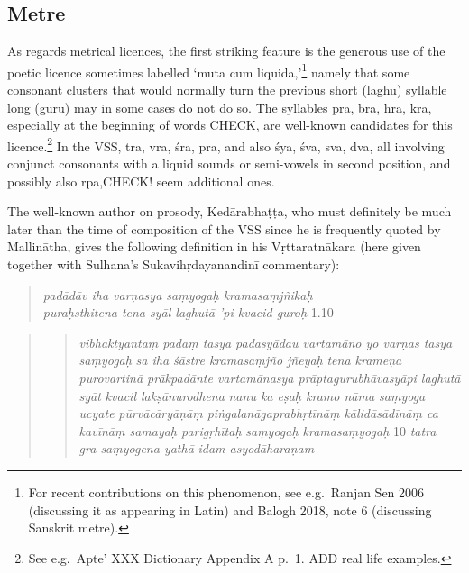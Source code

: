 \documentclass[12pt]{book}
\begin{document}
{%
\subsection{Metre}\label{metre}}

As regards metrical licences, the first striking feature is the generous
use of the poetic licence sometimes labelled `muta cum
liquida,'\footnote{For recent contributions on this phenomenon, see
  e.g.~Ranjan Sen 2006 (discussing it as appearing in Latin) and Balogh
  2018, note 6 (discussing Sanskrit metre).} namely that some consonant
clusters that would normally turn the previous short (laghu) syllable
long (guru) may in some cases do not do so. The syllables pra, bra, hra,
kra, especially at the beginning of words CHECK, are well-known
candidates for this licence.\footnote{See e.g.~Apte' XXX Dictionary
  Appendix A p.~1. ADD real life examples.} In the VSS, tra, vra, śra,
pra, and also śya, śva, sva, dva, all involving conjunct consonants with
a liquid sounds or semi-vowels in second position, and possibly also
rpa,CHECK! seem additional ones.

The well-known author on prosody, Kedārabhaṭṭa, who must definitely be
much later than the time of composition of the VSS since he is
frequently quoted by Mallinātha, gives the following definition in his
Vṛttaratnākara (here given together with Sulhana's Sukavihṛdayanandinī
commentary):

\begin{quote}
\emph{padādāv iha varṇasya saṃyogaḥ kramasaṃjñikaḥ} \textbar{}\\
\emph{puraḥsthitena tena syāl laghutā 'pi kvacid guroḥ}
\textbar{}\textbar{} 1.10 \textbar{}\textbar{}
\end{quote}

\begin{quote}
\begin{quote}
\emph{vibhaktyantaṃ padaṃ tasya padasyādau vartamāno yo varṇas tasya
saṃyogaḥ} \textbar{} \emph{sa iha śāstre kramasaṃjño jñeyaḥ} \textbar{}
\emph{tena krameṇa purovartinā prākpadānte vartamānasya
prāptagurubhāvasyāpi laghutā syāt} \textbar{} \emph{kvacil
lakṣānurodhena} \textbar{} \emph{nanu ka eṣaḥ kramo nāma saṃyoga ucyate}
\textbar{} \emph{pūrvācāryāṇāṃ piṅgalanāgaprabhṛtīnāṃ kālidāsādīnāṃ ca
kavīnāṃ samayaḥ parigṛhītaḥ} \textbar{} \emph{saṃyogaḥ kramasaṃyogaḥ}
\textbar{}\textbar{} 10 \textbar{}\textbar{} \emph{tatra gra-saṃyogena
yathā} \textbar{} \emph{idam asyodāharaṇam} \textbar{}
\end{quote}
\end{quote}
\end{document}
